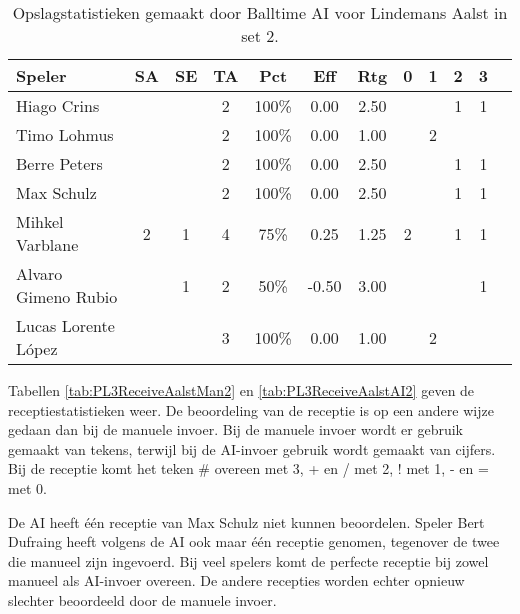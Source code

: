 \begin{table}[ht!]
  \centering
  \scriptsize
  \begin{tabular}{|l|c|c|c|c|c|c|c|c|c|c|c|} \hline
    \textbf{Speler} & SA & SE & TA & Pct & Eff & Rtg & 0 & 1 & 2 & 3  \\ \hline
    Hiago Crins &  &  & 2 & 100\% & 0.00 & 2.50 &   &  & 1 & 1  \\
    Timo Lohmus &  &  & 2 & 100\% & 0.00 & 1.00 &   & 2 &   &  \\
    Berre Peters &  &  & 2 & 100\% & 0.00 & 2.50 &   &  & 1 & 1 \\
    Max Schulz &  &  & 2 & 100\% & 0.00 & 2.50 &   &  & 1 & 1 \\
    Mihkel Varblane & 2 & 1 & 4 & 75\% & 0.25 & 1.25 & 2 &   & 1 & 1 \\
    Alvaro Gimeno Rubio & & 1 & 2 & 50\% & -0.50 & 3.00 &   &  & & 1 \\ 
    Lucas Lorente López &  &  & 3 & 100\% & 0.00 & 1.00 &   & 2 &   & \\  \hline
  \end{tabular}
  \caption[Opslagstatistieken gemaakt door Balltime AI voor Lindemans Aalst in set 2]{\label{tab:PL3ServeAalstAI2}Opslagstatistieken gemaakt door Balltime AI voor Lindemans Aalst in set 2.}
\end{table}

Tabellen \ref{tab:PL3ReceiveAalstMan2} en \ref{tab:PL3ReceiveAalstAI2} geven de receptiestatistieken weer. De beoordeling van de receptie is op een andere wijze gedaan dan bij de manuele invoer. Bij de manuele invoer wordt er gebruik gemaakt van tekens, terwijl bij de AI-invoer gebruik wordt gemaakt van cijfers. Bij de receptie komt het teken \# overeen met 3, + en / met 2, ! met 1, - en = met 0.

De AI heeft één receptie van Max Schulz niet kunnen beoordelen. Speler Bert Dufraing heeft volgens de AI ook maar één receptie genomen, tegenover de twee die manueel zijn ingevoerd. Bij veel spelers komt de perfecte receptie bij zowel manueel als AI-invoer overeen. De andere recepties worden echter opnieuw slechter beoordeeld door de manuele invoer.

